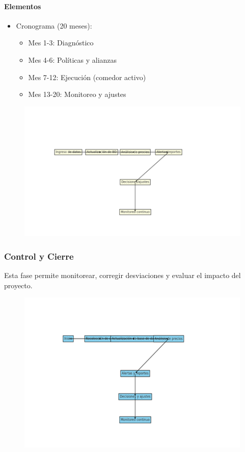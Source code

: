 \documentclass[letterpaper, 11pt]{report}
\begin{document}
\paragraph{Elementos}
\begin{itemize}
      \item Cronograma (20 meses):
            \begin{itemize}
                  \item Mes 1-3: Diagnóstico
                  \item Mes 4-6: Políticas y alianzas
                  \item Mes 7-12: Ejecución (comedor activo)
                  \item Mes 13-20: Monitoreo y ajustes
            \end{itemize}
\end{itemize}

\begin{figure}[H]
      \centering
      \includegraphics[width=\textwidth]{Images/elementos.png}
\end{figure}

\subsubsection{Control y Cierre}
Esta fase permite monitorear, corregir desviaciones y evaluar el impacto del proyecto.

\begin{figure}[H]
      \centering
      \includegraphics[width=\textwidth]{Images/control_cierre.png}
\end{figure}
\end{document}
